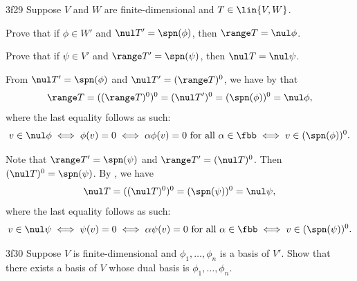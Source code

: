 \begin{exercise}{3f29}
    Suppose $V$ and $W$ are finite-dimensional and $T \in \lin{V, W}$.
    \begin{subexercises}
        \item Prove that if $\phi \in W'$ and $\nul T' = \spn(\phi)$, then $\range T = \nul \phi$.
        \item Prove that if $\psi \in V'$ and $\range T' = \spn(\psi)$, then $\nul T = \nul \psi$.
    \end{subexercises}
\end{exercise}

\begin{solenum}
    \item From $\nul T' = \spn(\phi)$ and $\nul T' = (\range T)^0$, we have by  that
    \[
    	\range T = ((\range T)^0)^0 = (\nul T')^0 = (\spn(\phi))^0 = \nul \phi,
    \]
    where the last equality follows as such:
    \[
    	v \in \nul \phi \iff \phi(v) = 0 \iff \alpha \phi(v) = 0~\text{for all}~\alpha \in \fbb \iff v \in (\spn(\phi))^0.
    \]
    \item Note that $\range T' = \spn(\psi)$ and $\range T' = (\nul T)^0$.
    Then $(\nul T)^0 = \spn(\psi)$.
    By , we have
    \[
    	\nul T = ((\nul T)^0)^0 = (\spn(\psi))^0 = \nul \psi,
    \]
    where the last equality follows as such:
    \[
    	v \in \nul \psi \iff \psi(v) = 0 \iff \alpha \psi(v) = 0~\text{for all}~\alpha \in \fbb \iff v \in (\spn(\psi))^0.
    \]
\end{solenum}

\begin{exercise}{3f30}
    Suppose $V$ is finite-dimensional and $\phi_1, \ldots, \phi_n$ is a basis of $V'$.
	Show that there exists a basis of $V$ whose dual basis is $\phi_1, \ldots, \phi_n$.
\end{exercise}

